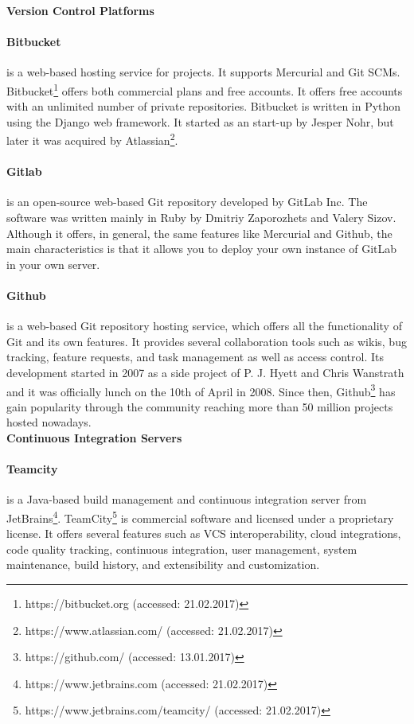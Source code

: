\textbf{Version Control Platforms}

\paragraph{Bitbucket}
is a web-based hosting service for projects. It supports Mercurial and Git SCMs. Bitbucket\footnote{https://bitbucket.org (accessed: 21.02.2017)} offers both commercial plans and free accounts. It offers free accounts with an unlimited number of private repositories. Bitbucket is written in Python using the Django web framework. It started as an start-up by Jesper Nohr, but later it was acquired by Atlassian\footnote{https://www.atlassian.com/ (accessed: 21.02.2017)}.
\paragraph{Gitlab}
is an open-source web-based Git repository developed by GitLab Inc. The software was written mainly in Ruby by Dmitriy Zaporozhets and Valery Sizov. Although it offers, in general, the same features like Mercurial and Github, the main characteristics is that it allows you to deploy your own instance of GitLab in your own server.
\paragraph{Github}
is a web-based Git repository hosting service, which offers all the functionality of Git and its own features. It provides several collaboration tools such as wikis, bug tracking, feature requests, and task management as well as access control. Its development started in 2007 as a side project of P. J. Hyett and Chris Wanstrath \cite{Weis2014} and it was officially lunch on the 10th of April in 2008. Since then, Github\footnote{https://github.com/ (accessed: 13.01.2017)} has gain popularity through the community reaching more than 50 million projects hosted nowadays.\\

\textbf{Continuous Integration Servers}

\paragraph{Teamcity}
is a Java-based build management and continuous integration server from JetBrains\footnote{https://www.jetbrains.com (accessed: 21.02.2017)}. TeamCity\footnote{https://www.jetbrains.com/teamcity/ (accessed: 21.02.2017)} is commercial software and licensed under a proprietary license. It offers several features such as VCS interoperability, cloud integrations, code quality tracking, continuous integration, user management, system maintenance, build history, and extensibility and customization. 
